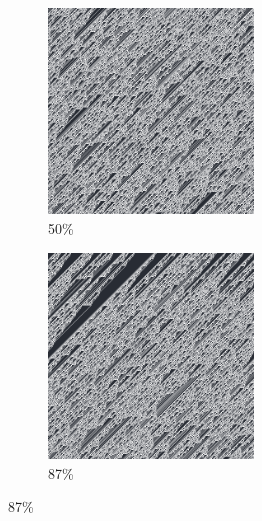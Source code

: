 \documentclass[12pt, fleqn]{report}                             %
\theoremstyle{break}                                            %
\begin{document}
\begin{figure}[ht!]
\begin{subfigure}[b]{0.4\linewidth}
          \includegraphics[width=0.6\textwidth]{Images/106/c.png}
          \caption{50\%}
        \end{subfigure}
        \begin{subfigure}[b]{0.4\linewidth}
          \includegraphics[width=0.6\textwidth]{Images/106/d.png}
          \caption{87\%}
        \end{subfigure}
      \end{figure}
\end{document}
